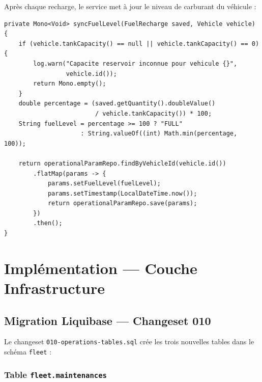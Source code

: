\documentclass[12pt,a4paper]{report}
\begin{document}
Après chaque recharge, le service met à jour le niveau de carburant du véhicule :

\begin{lstlisting}[style=javaStyle, caption={Mise à jour du niveau carburant}]
private Mono<Void> syncFuelLevel(FuelRecharge saved, Vehicle vehicle) {
    if (vehicle.tankCapacity() == null || vehicle.tankCapacity() == 0) {
        log.warn("Capacite reservoir inconnue pour vehicule {}",
                 vehicle.id());
        return Mono.empty();
    }
    double percentage = (saved.getQuantity().doubleValue()
                         / vehicle.tankCapacity()) * 100;
    String fuelLevel = percentage >= 100 ? "FULL"
                     : String.valueOf((int) Math.min(percentage, 100));

    return operationalParamRepo.findByVehicleId(vehicle.id())
        .flatMap(params -> {
            params.setFuelLevel(fuelLevel);
            params.setTimestamp(LocalDateTime.now());
            return operationalParamRepo.save(params);
        })
        .then();
}
\end{lstlisting}

\chapter{Implémentation — Couche Infrastructure}

\section{Migration Liquibase — Changeset 010}

Le changeset \texttt{010-operations-tables.sql} crée les trois nouvelles tables dans le schéma \texttt{fleet} :

\subsection{Table \texttt{fleet.maintenances}}
\end{document}
